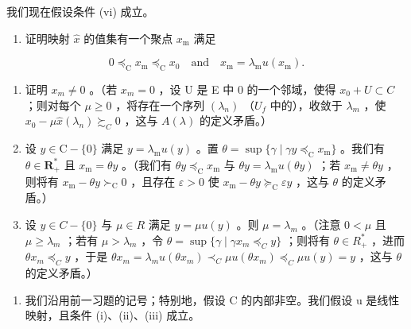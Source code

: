 我们现在假设条件 (vi) 成立。

\begin{enumerate}
\def\labelenumi{\alph{enumi})}
\setcounter{enumi}{2}
\tightlist
\item
  证明映射 \(\hat{x}\) 的值集有一个聚点 \(x_{\mathrm{m}}\) 满足
\end{enumerate}

\[
0 \preccurlyeq_ {\mathrm{C}} x _ {\mathrm{m}} \preccurlyeq_ {\mathrm{C}} x _ {0} \quad \text {and} \quad x _ {\mathrm{m}} = \lambda_ {\mathrm{m}} u (x _ {\mathrm{m}}).
\]

\begin{enumerate}
\def\labelenumi{\alph{enumi})}
\setcounter{enumi}{3}
\item
  证明 \(x_{m} \neq 0\) 。（若 \(x_{m} = 0\) ，设 U 是 E 中 0 的一个邻域，使得 \(x_{0} + U \subset C\) ；则对每个 \(\mu \geqslant 0\) ，将存在一个序列 \((\lambda_{n})\) （\(U_{f}\) 中的），收敛于 \(\lambda_{m}\) ，使 \(x_{0} - \mu \hat{x}(\lambda_{n}) \succsim_{C} 0\) ，这与 \(A(\lambda)\) 的定义矛盾。）
\item
  设 \(y \in \mathrm{C} - \{0\}\) 满足 \(y = \lambda_{\mathrm{m}} u(y)\) 。置 \(\theta = \sup \{\gamma \mid \gamma y \preccurlyeq_{\mathrm{C}} x_{\mathrm{m}}\}\) 。我们有 \(\theta \in \mathbf{R}_{+}^{*}\) 且 \(x_{\mathrm{m}} = \theta y\) 。（我们有 \(\theta y \preccurlyeq_{\mathrm{C}} x_{\mathrm{m}}\) 与 \(\theta y = \lambda_{\mathrm{m}} u(\theta y)\) ；若 \(x_{\mathrm{m}} \neq \theta y\) ，则将有 \(x_{\mathrm{m}} - \theta y \succ_{\mathrm{C}} 0\) ，且存在 \(\varepsilon > 0\) 使 \(x_{\mathrm{m}} - \theta y \succcurlyeq_{\mathrm{C}} \varepsilon y\) ，这与 \(\theta\) 的定义矛盾。）
\item
  设 \(y \in C - \{0\}\) 与 \(\mu \in R\) 满足 \(y = \mu u(y)\) 。则 \(\mu = \lambda_{m}\) 。（注意 \(0 < \mu\) 且 \(\mu \geqslant \lambda_{m}\) ；若有 \(\mu > \lambda_{m}\) ，令 \(\theta = \sup\{\gamma \mid \gamma x_{m} \preccurlyeq_{C} y\}\) ；则将有 \(\theta \in R_{+}^{*}\) ，进而 \(\theta x_{m} \preccurlyeq_{C} y\) ，于是 \(\theta x_{m} = \lambda_{m} u(\theta x_{m}) \prec_{C} \mu u(\theta x_{m}) \preccurlyeq_{C} \mu u(y) = y\) ，这与 \(\theta\) 的定义矛盾。）
\end{enumerate}

\begin{enumerate}
\def\labelenumi{\arabic{enumi})}
\setcounter{enumi}{28}
\tightlist
\item
  我们沿用前一习题的记号；特别地，假设 C 的内部非空。我们假设 u 是线性映射，且条件 (i)、(ii)、(iii) 成立。
\end{enumerate}

